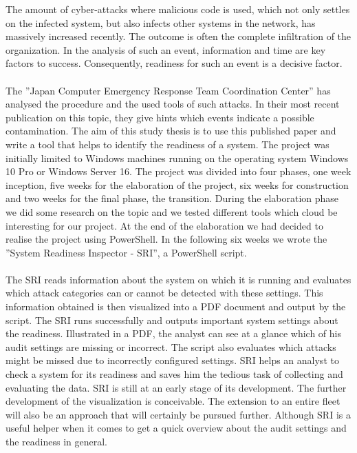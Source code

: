\thispagestyle{plain}
\renewcommand\section{\stdsection}
\vspace{-0.25cm}
\thispagestyle{plain}
The amount of cyber-attacks where malicious code is used, which not only settles on the infected system, but also infects other systems in the network, has massively increased recently. The outcome is often the complete infiltration of the organization. In the analysis of such an event, information and time are key factors to success. Consequently, readiness for such an event is a decisive factor. \\\\
The ''Japan Computer Emergency Response Team Coordination Center'' has analysed the procedure and the used tools of such attacks. In their most recent publication on this topic, they give hints which events indicate a possible contamination. The aim of this study thesis is to use this published paper and write a tool that helps to identify the readiness of a system.
\vspace{-0.25cm}
\thispagestyle{plain}
The project was initially limited to Windows machines running on the operating system Windows 10 Pro or Windows Server 16. The project was divided into four phases, one week inception, five weeks for the elaboration of the project, six weeks for construction and two weeks for the final phase, the transition. During the elaboration phase we did some research on the topic and we tested different tools which cloud be interesting for our project. At the end of the elaboration we had decided to realise the project using PowerShell. In the following six weeks we wrote the ''System Readiness Inspector - SRI'', a PowerShell script. \\\\
The SRI reads information about the system on which it is running and evaluates which attack categories can or cannot be detected with these settings. This information obtained is then visualized into a PDF document and output by the script.
\vspace{-0.25cm}
\thispagestyle{plain}
The SRI runs successfully and outputs important system settings about the readiness. Illustrated in a PDF, the analyst can see at a glance which of his audit settings are missing or incorrect. The script also evaluates which attacks might be missed due to incorrectly configured settings. SRI helps an analyst to check a system for its readiness and saves him the tedious task of collecting and evaluating the data.
\vspace{-0.25cm}
\thispagestyle{plain}
SRI is still at an early stage of its development. The further development of the visualization is conceivable. The extension to an entire fleet will also be an approach that will certainly be pursued further. Although SRI is a useful helper when it comes to get a quick overview about the audit settings and the readiness in general.



\renewcommand\section{\clearpage\stdsection}